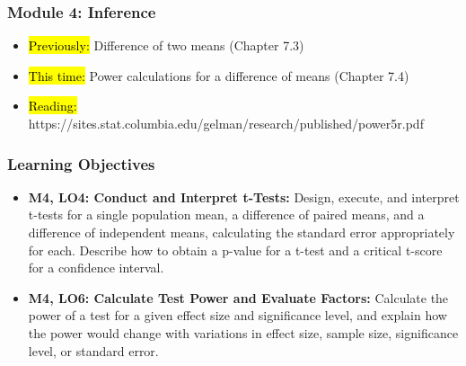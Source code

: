 
\begin{frame}
    \frametitle{Module 4: Inference}
    \begin{itemize}
        \item \hl{Previously: }Difference of two means (Chapter 7.3)
        \item \hl{This time: }Power calculations for a difference of means (Chapter 7.4)
        \item \hl{Reading: }https://sites.stat.columbia.edu/gelman/research/published/power5r.pdf
    \end{itemize}

\end{frame}
\begin{frame}
    \frametitle{Learning Objectives}
    \begin{itemize}
        \item \textbf{M4, LO4: Conduct and Interpret t-Tests:} Design, execute, and interpret t-tests for a single population mean, a difference of paired means, and a difference of independent means, calculating the standard error appropriately for each. Describe how to obtain a p-value for a t-test and a critical t-score for a confidence interval.
        \item \textbf{M4, LO6: Calculate Test Power and Evaluate Factors:} Calculate the power of a test for a given effect size and significance level, and explain how the power would change with variations in effect size, sample size, significance level, or standard error.
    \end{itemize}
\end{frame}
